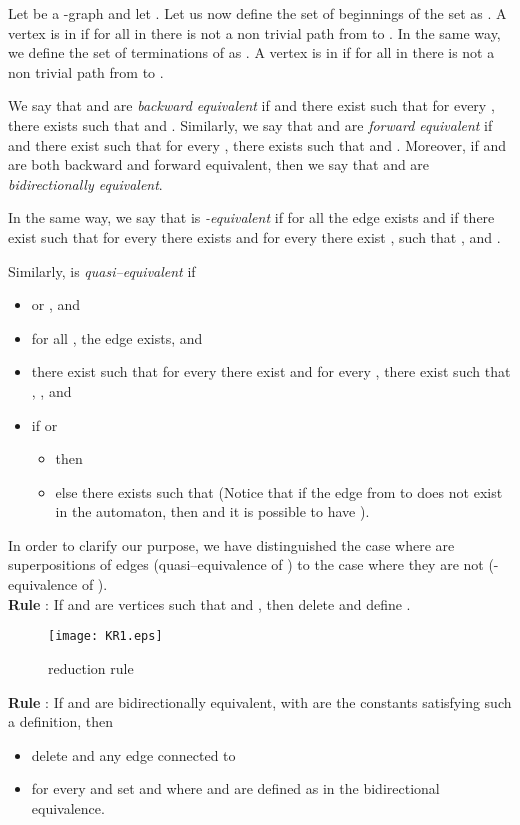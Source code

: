 \documentclass[11pt]{article}
\begin{document}
Let  be a -graph and let . Let us now define the set of beginnings of the set  as . A vertex   is in  if  for all  in  there is not a non trivial path from  to . In the same way, we define the set of terminations of  as  .  A vertex   is in  if for all  in  there is not a non trivial path from  to .

We say that  and  are {\it backward equivalent} if  and there exist  such that for every , there exists  such that  and . Similarly, we say that  and  are {\it forward equivalent} if  and there exist  such that for every , there exists  such that  and . Moreover, if  and  are both backward and forward equivalent, then we say that  and  are {\it bidirectionally equivalent}.

 In the same way, we say that  is {\it -equivalent}  if for all  the edge  exists and if there exist  such that for every  there exists  and for every  there exist ,  such that ,  and  .
 
Similarly,  is {\it quasi--equivalent} if 
\begin{itemize}
\item   or , and
\item for all , the edge  exists, and 
\item  there exist  such that for every  there exist  and for every , there exist  such that  , , and
\item  if  or  
\begin{itemize}
\item   then  
\item else  there exists  such that  (Notice that if the edge from  to  does not exist in the automaton, then  and it is possible to have ).
\end{itemize}
\end{itemize}
In order to clarify our purpose, we have distinguished the case where  are superpositions of edges (quasi--equivalence  of ) to the case where they are not (-equivalence  of ).\\

\noindent
{\bf Rule} : If  and  are vertices such that  and , then delete  and define .\\


\begin{figure}[H]
\centerline{\texttt{[image: KR1.eps]}}
\caption{ reduction rule}\label{KR1-rule}
\end{figure}
\noindent
{\bf Rule}  : If   and  are bidirectionally equivalent, with  are the constants satisfying such a definition,
then 
\begin{itemize}
\item delete   and any edge connected to  
\item for every  and  set  and   where  and  are defined as in the bidirectional equivalence. 
\end{itemize}
\end{document}
